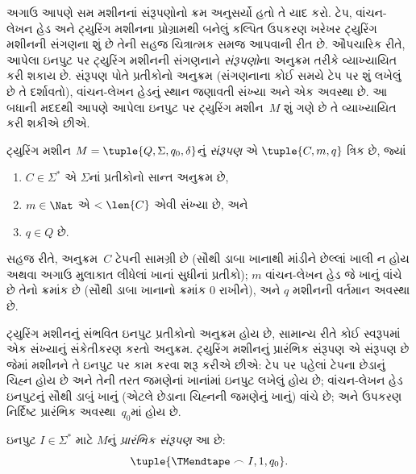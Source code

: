 \begin{explain}
અગાઉ આપણે સમ મશીનનાં સંરૂપણોનો ક્રમ અનુસર્યો હતો તે યાદ
કરો. ટેપ, વાંચન-લેખન હેડ અને ટ્યુરિંગ મશીનના પ્રોગ્રામથી
બનેલું કલ્પિત ઉપકરણ ખરેખર ટ્યુરિંગ મશીનની સંગણના શું છે
તેની સહજ ચિત્રાત્મક સમજ આપવાની રીત છે. ઔપચારિક રીતે,
આપેલા ઇનપુટ પર ટ્યુરિંગ મશીનની સંગણનાને
\emph{સંરૂપણો}ના અનુક્રમ તરીકે વ્યાખ્યાયિત કરી શકાય છે.
સંરૂપણ પોતે પ્રતીકોનો અનુક્રમ (સંગણનાના કોઈ સમયે ટેપ
પર શું લખેલું છે તે દર્શાવતો), વાંચન-લેખન હેડનું સ્થાન
જણાવતી સંખ્યા અને એક અવસ્થા છે. આ બધાની મદદથી આપણે
આપેલા ઇનપુટ પર ટ્યુરિંગ મશીન~$M$ શું ગણે છે તે
વ્યાખ્યાયિત કરી શકીએ છીએ.
\end{explain}

\begin{defn}[સંરૂપણ]
ટ્યુરિંગ મશીન $M = \tuple{Q, \Sigma, q_0,
\delta}$નું \emph{સંરૂપણ} એ $\tuple{C, m, q}$ ત્રિક છે, જ્યાં
\begin{enumerate}
\item $C \in \Sigma^*$ એ $\Sigma$નાં પ્રતીકોનો સાન્ત અનુક્રમ છે,
\item $m \in \Nat$ એ $< \len{C}$ એવી સંખ્યા છે, અને
\item $q \in Q$ છે.
\end{enumerate}
સહજ રીતે, અનુક્રમ~$C$ ટેપની સામગ્રી છે (સૌથી ડાબા
ખાનાથી માંડીને છેલ્લાં ખાલી ન હોય અથવા અગાઉ મુલાકાત
લીધેલાં ખાનાં સુધીનાં પ્રતીકો); $m$ વાંચન-લેખન હેડ જે
ખાનું વાંચે છે તેનો ક્રમાંક છે (સૌથી ડાબા ખાનાનો ક્રમાંક
$0$ રાખીને), અને $q$ મશીનની વર્તમાન અવસ્થા છે.
\end{defn}

\begin{explain}
ટ્યુરિંગ મશીનનું સંભવિત ઇનપુટ પ્રતીકોનો અનુક્રમ હોય છે,
સામાન્ય રીતે કોઈ સ્વરૂપમાં એક સંખ્યાનું સંકેતીકરણ કરતો
અનુક્રમ. ટ્યુરિંગ મશીનનું પ્રારંભિક સંરૂપણ એ સંરૂપણ છે જેમાં
મશીનને તે ઇનપુટ પર કામ કરવા શરૂ કરીએ છીએ: ટેપ પર પહેલાં
ટેપના છેડાનું ચિહ્ન હોય છે અને તેની તરત જમણેનાં ખાનાંમાં
ઇનપુટ લખેલું હોય છે; વાંચન-લેખન હેડ ઇનપુટનું સૌથી ડાબું
ખાનું (એટલે છેડાના ચિહ્નની જમણેનું ખાનું) વાંચે છે; અને
ઉપકરણ નિર્દિષ્ટ પ્રારંભિક અવસ્થા~$q_0$માં હોય છે.
\end{explain}

\begin{defn}[પ્રારંભિક સંરૂપણ]
ઇનપુટ $I \in \Sigma^*$ માટે $M$નું \emph{પ્રારંભિક સંરૂપણ}
આ છે:
\[
\tuple{\TMendtape \frown I, 1, q_0}.
\]
\end{defn}



